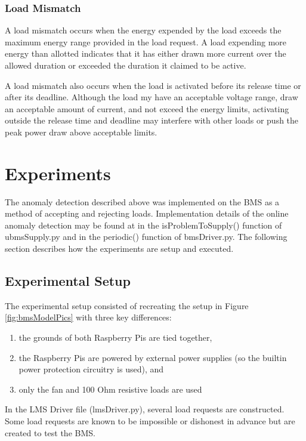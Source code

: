 \documentclass[11pt,conference,draftcls,onecolumn]{IEEEtran}
\begin{document}
\subsubsection{Load Mismatch}
A load mismatch occurs when the energy expended by the load exceeds the maximum energy range provided in the load request.
A load expending more energy than allotted indicates that it has either drawn more current over the allowed duration or exceeded the duration it claimed to be active.

A load mismatch also occurs when the load is activated before its release time or after its deadline. 
Although the load my have an acceptable voltage range, draw an acceptable amount of current, and not exceed the energy limits, activating outside the release time and deadline may interfere with other loads or push the peak power draw above acceptable limits.


\section{Experiments}\label{sec:experiments}
The anomaly detection described above was implemented on the BMS as a method of accepting and rejecting loads.
Implementation details of the online anomaly detection may be found at in the isProblemToSupply() function of ubmsSupply.py and in the periodic() function of bmsDriver.py.  
The following section describes how the experiments are setup and executed.

\subsection{Experimental Setup}
The experimental setup consisted of recreating the setup in Figure \ref{fig:bmsModelPics} with three key differences:
\begin{enumerate}
    \item the grounds of both Raspberry Pis are tied together,
    \item the Raspberry Pis are powered by external power supplies (so the builtin power protection circuitry is used), and
    \item only the fan and 100 Ohm resistive loads are used
\end{enumerate}

In the LMS Driver file (lmsDriver.py), several load requests are constructed.
Some load requests are known to be impossible or dishonest in advance but are created to test the BMS.
\end{document}
